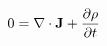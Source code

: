 \documentclass[preview]{standalone}
\begin{document}
\begin{align*}
0 = \nabla \cdot \mathbf{J} + \pdv{\rho}{t}
\end{align*}
\end{document}
